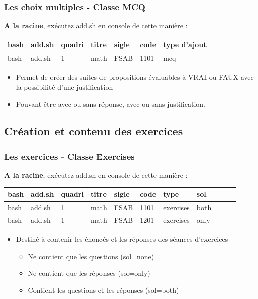 \documentclass{beamer}
\begin{document}
\begin{frame}
    \frametitle{Les choix multiples - Classe MCQ}
    \begin{exampleblock}{\textbf{A la racine}, exécutez add.sh en
    console de cette manière :}
       \begin{tabular}{lllllll}
           bash & add.sh & quadri & titre & sigle & code & type d'ajout
           \\ \hline
           bash & add.sh & 1 & math & FSAB & 1101 & mcq \\
       \end{tabular}
    \end{exampleblock}
    \begin{itemize}
        \item Permet de créer des suites de propositions évaluables à
            VRAI ou FAUX avec la possibilité d'une justification
        \item Pouvant être avec ou sans réponse, avec ou sans
            justification.
    \end{itemize}
\end{frame}


\subsection{Création et contenu des exercices}

\begin{frame}
    \frametitle{Les exercices - Classe Exercises}
    \begin{exampleblock}{\textbf{A la racine}, exécutez add.sh en
    console de cette manière :}
       \begin{tabular}{lllllllllll}
           bash & add.sh & quadri & titre & sigle & code & type & sol \\
           \hline
           bash & add.sh & 1 & math & FSAB & 1101 & exercises & both \\
           bash & add.sh & 1 & math & FSAB & 1201 & exercises & only \\
       \end{tabular}
   \end{exampleblock}
   \begin{itemize}
       \item Destiné à contenir les énoncés et les réponses des séances
           d'exercices
           \begin{itemize}
               \item Ne contient que les questions (sol=none)
               \item Ne contient que les réponses (sol=only)
               \item Contient les questions et les réponses (sol=both)
       \end{itemize}
   \end{itemize}

\end{frame}
\end{document}
